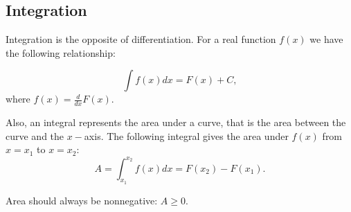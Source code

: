 \documentclass[a4paper,11pt]{article}
\begin{document}
\subsection{Integration}
Integration is the opposite of differentiation. For a real function $f(x)$ we have the following relationship:

\begin{equation}
\int f(x) dx = F(x)+C,
\end{equation}
where $f(x)=\frac{d}{dx} F(x)$.

Also, an integral represents the area under a curve, that is the area between the curve and the $x-$axis. The following integral gives the area under $f(x)$ from $x=x_1$ to $x=x_2$:
\begin{equation}
A=\int_{x_1}^{x_2} f(x) dx = F(x_2)-F(x_1).
\end{equation}

Area should always be nonnegative: $A \geq 0$.
\end{document}

